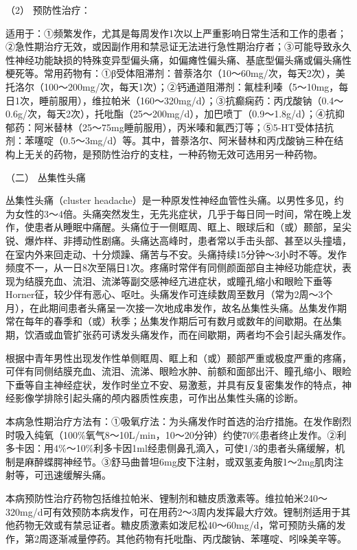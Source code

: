 \hypertarget{text00020.htmlux5cux23CHP1-7-4-1-2-2}{}
（2） 预防性治疗：

适用于：①频繁发作，尤其是每周发作1次以上严重影响日常生活和工作的患者；②急性期治疗无效，或因副作用和禁忌证无法进行急性期治疗者；③可能导致永久性神经功能缺损的特殊变异型偏头痛，如偏瘫性偏头痛、基底型偏头痛或偏头痛性梗死等。常用药物有：①β受体阻滞剂：普萘洛尔（10～60mg/次，每天2次），美托洛尔（100～200mg/次，每天1次）；②钙通道阻滞剂：氟桂利嗪（5～10mg，每日1次，睡前服用），维拉帕米（160～320mg/d）；③抗癫痫药：丙戊酸钠（0.4～0.6g/次，每天2次），托吡酯（25～200mg/d），加巴喷丁（0.9～1.8g/d）；④抗抑郁药：阿米替林（25～75mg睡前服用），丙米嗪和氟西汀等；⑤5-HT受体拮抗剂：苯噻啶（0.5～3mg/d）等。其中，普萘洛尔、阿米替林和丙戊酸钠三种在结构上无关的药物，是预防性治疗的支柱，一种药物无效可选用另一种药物。

\hypertarget{text00020.htmlux5cux23CHP1-7-4-2}{}
（二） 丛集性头痛

丛集性头痛（cluster
headache）是一种原发性神经血管性头痛。以男性多见，约为女性的3～4倍。头痛突然发生，无先兆症状，几乎于每日同一时间，常在晚上发作，使患者从睡眠中痛醒。头痛位于一侧眶周、眶上、眼球后和（或）颞部，呈尖锐、爆炸样、非搏动性剧痛。头痛达高峰时，患者常以手击头部、甚至以头撞墙，在室内外来回走动、十分烦躁、痛苦与不安。头痛持续15分钟～3小时不等。发作频度不一，从一日8次至隔日1次。疼痛时常伴有同侧颜面部自主神经功能症状，表现为结膜充血、流泪、流涕等副交感神经亢进症状，或瞳孔缩小和眼睑下垂等Horner征，较少伴有恶心、呕吐。头痛发作可连续数周至数月（常为2周～3个月），在此期间患者头痛呈一次接一次地成串发作，故名丛集性头痛。丛集发作期常在每年的春季和（或）秋季；丛集发作期后可有数月或数年的间歇期。在丛集期，饮酒或血管扩张药可诱发头痛发作，而在间歇期，两者均不会引起头痛发作。

根据中青年男性出现发作性单侧眶周、眶上和（或）颞部严重或极度严重的疼痛，可伴有同侧结膜充血、流泪、流涕、眼睑水肿、前额和面部出汗、瞳孔缩小、眼睑下垂等自主神经症状，发作时坐立不安、易激惹，并具有反复密集发作的特点，神经影像学排除引起头痛的颅内器质性疾患，可作出丛集性头痛的诊断。

本病急性期治疗方法有：①吸氧疗法：为头痛发作时首选的治疗措施。在发作剧烈时吸入纯氧（100\%氧气8～10L/min，10～20分钟）约使70\%患者终止发作。②利多卡因：用4\%～10\%利多卡因1ml经患侧鼻孔滴入，可使1/3的患者头痛缓解，机制是麻醉蝶腭神经节。③舒马曲普坦6mg皮下注射，或双氢麦角胺1～2mg肌肉注射等，可迅速缓解头痛。

本病预防性治疗药物包括维拉帕米、锂制剂和糖皮质激素等。维拉帕米240～320mg/d可有效预防本病发作，可在用药2～3周内发挥最大疗效。锂制剂适用于其他药物无效或有禁忌证者。糖皮质激素如泼尼松40～60mg/d，常可预防头痛的发作，第2周逐渐减量停药。其他药物有托吡酯、丙戊酸钠、苯噻啶、吲哚美辛等。

